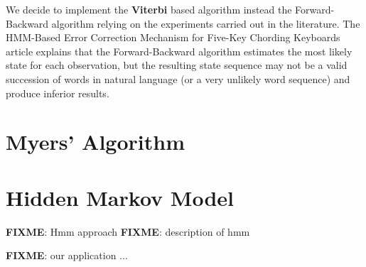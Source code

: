 We decide to implement the \textbf{Viterbi} based algorithm instead the Forward-Backward algorithm relying on the 
experiments carried out in the literature.
The HMM-Based Error Correction Mechanism for Five-Key Chording Keyboards article \cite{tarniceriu2015hmm} explains 
that the Forward-Backward algorithm estimates the most likely state for each observation, but the resulting state 
sequence may not be a valid succession of words in natural language (or a very unlikely word sequence) and produce 
inferior results.

\section{Myers' Algorithm}


\section{Hidden Markov Model}


\textbf{FIXME}: Hmm approach
\textbf{FIXME}: description of hmm

\textbf{FIXME}: our application ...